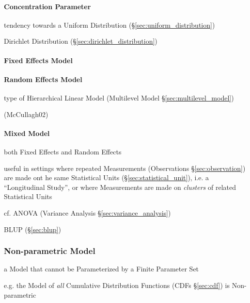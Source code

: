 \paragraph{Concentration Parameter}\label{sec:concentration_parameter}\hfill

tendency towards a Uniform Distribution (\S\ref{sec:uniform_distribution})

Dirichlet Distribution (\S\ref{sec:dirichlet_distribution})



\paragraph{Fixed Effects Model}\label{sec:fixed_effect}\hfill

\paragraph{Random Effects Model}\label{sec:random_effect}\hfill

type of Hierarchical Linear Model (Multilevel Model
\S\ref{sec:multilevel_model})

(McCullagh02)



\paragraph{Mixed Model}\label{sec:mixed_model}\hfill

both Fixed Effects and Random Effects

useful in settings where repeated Measurements (Observations
\S\ref{sec:observation}) are made ont he same Statistical Units
(\S\ref{sec:statistical_unit}), i.e. a ``Longitudinal Study'', or where
Measurements are made on \emph{clusters} of related Statistical Units

cf. ANOVA (Variance Analysis \S\ref{sec:variance_analysis})

BLUP (\S\ref{sec:blup})



\subsubsection{Non-parametric Model}\label{sec:nonparametric_model}

a Model that cannot be Parameterized by a Finite Parameter Set

e.g. the Model of \emph{all} Cumulative Distribution Functions (CDFs
\S\ref{sec:cdf}) is Non-parametric

